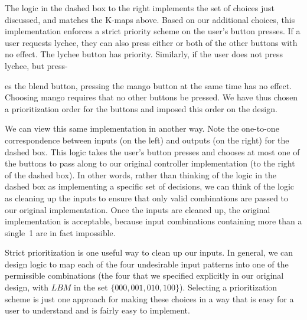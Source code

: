 \begin{minipage}{2.45in}
The logic in the dashed box to the right implements the set of choices
just discussed, and matches the K-maps above.
%
Based on our additional choices, this implementation enforces
a strict priority scheme on the user's button presses.
%
If a user requests lychee, they can also press either or
both of the other buttons with no effect.  The lychee button has
priority.  Similarly, if the user does not press lychee, but press-\linebreak
\end{minipage}\hspace{.25in}%
\begin{minipage}{3.8in}
\vspace{12pt}
\end{minipage}\mpdone

es the blend button, pressing the mango button at the same time has no
effect.  Choosing mango requires that no other buttons be pressed.
We have thus chosen a prioritization order for the buttons and imposed 
this order on the design.

We can view this same implementation in another way.
%
Note the one-to-one correspondence between inputs (on the left) and 
outputs (on the right) for the dashed box.
%
This logic takes the user's button presses and chooses at most one of
the buttons to pass along to our original controller implementation 
(to the right of the dashed box).
%
In other words, rather than thinking of the logic in the dashed
box as implementing a specific set of decisions, we can think of the
logic as cleaning up the inputs to ensure that only valid
combinations are passed to our original implementation.
%
Once the inputs are cleaned up, the original implementation is 
acceptable, because input combinations containing more than a 
single~1 are in fact impossible.

Strict prioritization is one useful way to clean up our inputs.
%
In general, we can design logic to map each
of the four undesirable input patterns into one of the permissible 
combinations (the
four that we specified explicitly in our original design, with $LBM$ 
in the set $\{000,001,010,100\}$).  Selecting a prioritization scheme
is just one approach for making these choices in a way
that is easy for a user to understand and 
is fairly easy to implement.

